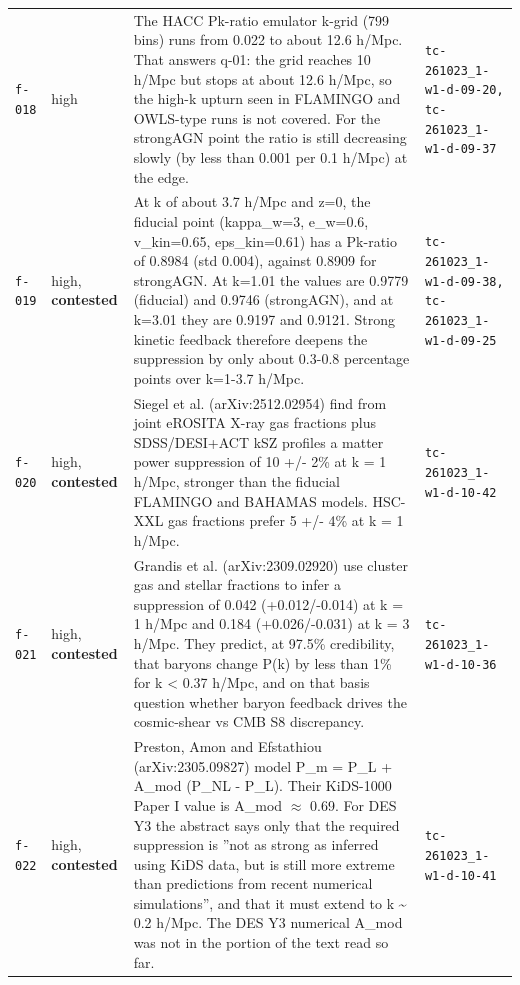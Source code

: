 \documentclass[11pt,a4paper]{article}
\begin{document}
\begin{longtable}{@{}p{}p{}p{}p{}@{}}
\texttt{f-018} & high & The HACC Pk-ratio emulator k-grid (799 bins) runs from 0.022 to about 12.6 h/Mpc. That answers q-01: the grid reaches 10 h/Mpc but stops at about 12.6 h/Mpc, so the high-k upturn seen in FLAMINGO and OWLS-type runs is not covered. For the strongAGN point the ratio is still decreasing slowly (by less than 0.001 per 0.1 h/Mpc) at the edge. & \texttt{tc-261023\_\allowbreak{}1-w1-d-09-20,\allowbreak{} tc-261023\_\allowbreak{}1-w1-d-09-37} \\
\texttt{f-019} & high, \textbf{contested} & At k of about 3.7 h/Mpc and z=0, the fiducial point (kappa\_w=3, e\_w=0.6, v\_kin=0.65, eps\_kin=0.61) has a Pk-ratio of 0.8984 (std 0.004), against 0.8909 for strongAGN. At k=1.01 the values are 0.9779 (fiducial) and 0.9746 (strongAGN), and at k=3.01 they are 0.9197 and 0.9121. Strong kinetic feedback therefore deepens the suppression by only about 0.3-0.8 percentage points over k=1-3.7 h/Mpc. & \texttt{tc-261023\_\allowbreak{}1-w1-d-09-38,\allowbreak{} tc-261023\_\allowbreak{}1-w1-d-09-25} \\
\texttt{f-020} & high, \textbf{contested} & Siegel et al. (arXiv:2512.02954) find from joint eROSITA X-ray gas fractions plus SDSS/DESI+ACT kSZ profiles a matter power suppression of 10 +/- 2\% at k = 1 h/Mpc, stronger than the fiducial FLAMINGO and BAHAMAS models. HSC-XXL gas fractions prefer 5 +/- 4\% at k = 1 h/Mpc. & \texttt{tc-261023\_\allowbreak{}1-w1-d-10-42} \\
\texttt{f-021} & high, \textbf{contested} & Grandis et al. (arXiv:2309.02920) use cluster gas and stellar fractions to infer a suppression of 0.042 (+0.012/-0.014) at k = 1 h/Mpc and 0.184 (+0.026/-0.031) at k = 3 h/Mpc. They predict, at 97.5\% credibility, that baryons change P(k) by less than 1\% for k \textless{} 0.37 h/Mpc, and on that basis question whether baryon feedback drives the cosmic-shear vs CMB S8 discrepancy. & \texttt{tc-261023\_\allowbreak{}1-w1-d-10-36} \\
\texttt{f-022} & high, \textbf{contested} & Preston, Amon and Efstathiou (arXiv:2305.09827) model P\_m = P\_L + A\_mod (P\_NL - P\_L). Their KiDS-1000 Paper I value is A\_mod $\approx$ 0.69. For DES Y3 the abstract says only that the required suppression is ''not as strong as inferred using KiDS data, but is still more extreme than predictions from recent numerical simulations'', and that it must extend to k \textasciitilde{} 0.2 h/Mpc. The DES Y3 numerical A\_mod was not in the portion of the text read so far. & \texttt{tc-261023\_\allowbreak{}1-w1-d-10-41} \\

\end{longtable}
\end{document}
